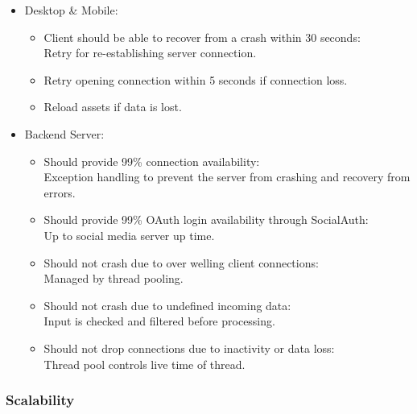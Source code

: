 \documentclass[letterpaper]{article}
\begin{document}
					\begin{itemize}
						\item Desktop \& Mobile:
							\begin{itemize}
								\item Client should be able to recover from a crash within 30 seconds: \\
										Retry for re-establishing server connection.
								\item Retry opening connection within 5 seconds if connection loss.
								\item Reload assets if data is lost.
							\end{itemize}
						\item Backend Server:
							\begin{itemize}
								\item Should provide 99\% connection availability: \\
										Exception handling to prevent the server from crashing and recovery from errors.
								\item Should provide 99\% OAuth login availability through SocialAuth: \\
										Up to social media server up time.
								\item Should not crash due to over welling client connections: \\
										Managed by thread pooling.
								\item Should not crash due to undefined incoming data: \\
										Input is checked and filtered before processing.
								\item Should not drop connections due to inactivity or data loss: \\
										Thread pool controls live time of thread.
							\end{itemize}
					\end{itemize}
					
				\subsubsection*{Scalability}
				\vspace{0.1in}
					
\end{document}
